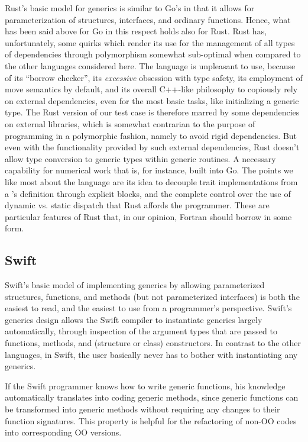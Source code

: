 \documentclass[11pt,oneside]{report}
\newcommand{\code}[1]{{\selectfont\ttfamily{#1}}}
\begin{document}
Rust's basic model for generics is similar to Go's in that it allows
for parameterization of structures, interfaces, and ordinary
functions. Hence, what has been said above for Go in this respect
holds also for Rust. Rust has, unfortunately, some quirks which render
its use for the management of all types of dependencies through
polymorphism somewhat sub-optimal when compared to the other languages
considered here. The language is unpleasant to use, because of its
``borrow checker'', its \emph{excessive} obsession with type safety,
its employment of move semantics by default, and its overall C++-like
philosophy to copiously rely on external dependencies, even for the
most basic tasks, like initializing a generic type. The Rust version
of our test case is therefore marred by some dependencies on external
libraries, which is somewhat contrarian to the purpose of programming
in a polymorphic fashion, namely to avoid rigid dependencies. But even
with the functionality provided by such external dependencies, Rust
doesn't allow type conversion to generic types within generic
routines. A necessary capability for numerical work that is, for
instance, built into Go. The points we like most about the language
are its idea to decouple trait implementations from a \code{struct}'s
definition through explicit \code{impl} blocks, and the complete
control over the use of dynamic vs. static dispatch that Rust affords
the programmer. These are particular features of Rust that, in our
opinion, Fortran should borrow in some form.

\subsection{Swift}

Swift's basic model of implementing generics by allowing parameterized
structures, functions, and methods (but not parameterized interfaces)
is both the easiest to read, and the easiest to use from a
programmer's perspective. Swift's generics design allows the Swift
compiler to instantiate generics largely automatically, through
inspection of the argument types that are passed to functions,
methods, and (structure or class) constructors. In contrast to the
other languages, in Swift, the user basically never has to bother with
instantiating any generics.

If the Swift programmer knows how to write generic functions, his
knowledge automatically translates into coding generic methods, since
generic functions can be transformed into generic methods without
requiring any changes to their function signatures. This property is
helpful for the refactoring of non-OO codes into corresponding OO
versions.
\end{document}
